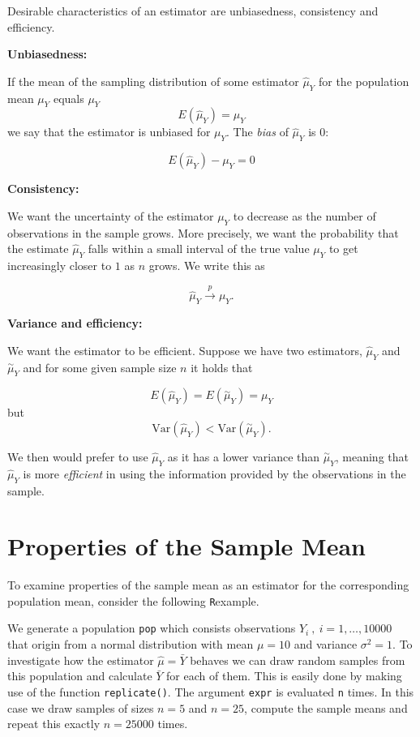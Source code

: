\documentclass[]{book}
\newcommand{\comma}{,\,}
\theoremstyle{definition}
\theoremstyle{definition}
\theoremstyle{definition}
\theoremstyle{remark}
\begin{document}
\begin{keyconcepts}[Bias\comma Consistency and Efficiency]{3.2}
Desirable characteristics of an estimator are unbiasedness, consistency and efficiency.\newline

\textbf{Unbiasedness:}

If the mean of the sampling distribution of some estimator $\hat\mu_Y$ for the population mean $\mu_Y$ equals $\mu_Y$
$$ E(\hat\mu_Y) = \mu_Y $$
we say that the estimator is unbiased for $\mu_Y$. The \textit{bias} of $\hat\mu_Y$ is $0$:

$$ E(\hat\mu_Y) - \mu_Y = 0$$

\textbf{Consistency:}

We want the uncertainty of the estimator $\mu_Y$ to decrease as the number of observations in the sample grows. More precisely, we want the probability that the estimate $\hat\mu_Y$ falls within a small interval of the true value $\mu_Y$ to get increasingly closer to $1$ as $n$ grows. We write this as

$$ \hat\mu_Y \xrightarrow{p} \mu_Y. $$

\textbf{Variance and efficiency:}

We want the estimator to be efficient. Suppose we have two estimators, $\hat\mu_Y$ and $\overset{\sim}{\mu}_Y$ and for some given sample size $n$ it holds that

$$ E(\hat\mu_Y) = E(\overset{\sim}{\mu}_Y) = \mu_Y $$
but
$$\text{Var}(\hat\mu_Y) < \text{Var}(\overset{\sim}{\mu}_Y).$$

We then would prefer to use $\hat\mu_Y$ as it has a lower variance than $\overset{\sim}{\mu}_Y$, meaning that $\hat\mu_Y$ is more \textit{efficient} in using the information provided by the observations in the sample.
\end{keyconcepts}

\section{Properties of the Sample Mean}\label{potsm}

To examine properties of the sample mean as an estimator for the
corresponding population mean, consider the following \texttt{R}example.

We generate a population \texttt{pop} which consists observations
\(Y_i \ , \ i=1,\dots,10000\) that origin from a normal distribution
with mean \(\mu = 10\) and variance \(\sigma^2 = 1\). To investigate how
the estimator \(\hat{\mu} = \bar{Y}\) behaves we can draw random samples
from this population and calculate \(\bar{Y}\) for each of them. This is
easily done by making use of the function \texttt{replicate()}. The
argument \texttt{expr} is evaluated \texttt{n} times. In this case we
draw samples of sizes \(n=5\) and \(n=25\), compute the sample means and
repeat this exactly \(n=25000\) times.
\end{document}
